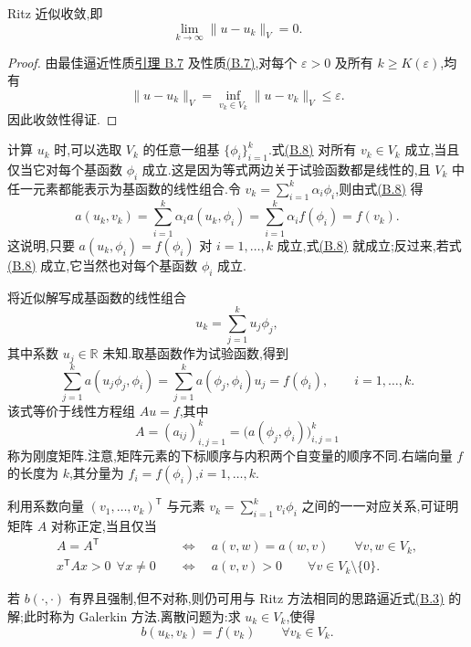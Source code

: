 \begin{theorem}\label{thm:appendix-b-8}
Ritz 近似收敛,即
\[
 \lim_{k\to\infty}\|u-u_k\|_V=0.
\]
\end{theorem}
\begin{proof}
由最佳逼近性质\hyperref[lem:appendix-b-7]{引理 B.7} 及性质\hyperref[eq:appendix-b-7]{(B.7)},对每个 $\varepsilon>0$ 及所有 $k\ge K(\varepsilon)$,均有
\[
 \|u-u_k\|_V=\inf_{v_k\in V_k}\|u-v_k\|_V\le\varepsilon.
\]
因此收敛性得证.
\end{proof}

\begin{note}\label{note:appendix-b-9}
计算 $u_k$ 时,可以选取 $V_k$ 的任意一组基 $\{\phi_i\}_{i=1}^k$.式\hyperref[eq:appendix-b-8]{(B.8)} 对所有 $v_k\in V_k$ 成立,当且仅当它对每个基函数 $\phi_i$ 成立.这是因为等式两边关于试验函数都是线性的,且 $V_k$ 中任一元素都能表示为基函数的线性组合.令
$v_k=\sum_{i=1}^k\alpha_i\phi_i$,则由式\hyperref[eq:appendix-b-8]{(B.8)} 得
\[
 a(u_k,v_k)=\sum_{i=1}^k\alpha_i a(u_k,\phi_i)
 =\sum_{i=1}^k\alpha_i f(\phi_i)=f(v_k).
\]
这说明,只要 $a(u_k,\phi_i)=f(\phi_i)$ 对 $i=1,\ldots,k$ 成立,式\hyperref[eq:appendix-b-8]{(B.8)} 就成立;反过来,若式\hyperref[eq:appendix-b-8]{(B.8)} 成立,它当然也对每个基函数 $\phi_i$ 成立.

将近似解写成基函数的线性组合
\[
 u_k=\sum_{j=1}^k u_j\phi_j,
\]
其中系数 $u_j\in\mathbb R$ 未知.取基函数作为试验函数,得到
\[
 \sum_{j=1}^k a(u_j\phi_j,\phi_i)
 =\sum_{j=1}^k a(\phi_j,\phi_i)u_j
 =f(\phi_i),\qquad i=1,\ldots,k.
\]
该式等价于线性方程组 $Au=f$,其中
\[
 A=(a_{ij})_{i,j=1}^k
   =\bigl(a(\phi_j,\phi_i)\bigr)_{i,j=1}^k
\]
称为刚度矩阵.注意,矩阵元素的下标顺序与内积两个自变量的顺序不同.右端向量 $f$ 的长度为 $k$,其分量为 $f_i=f(\phi_i)$,$i=1,\ldots,k$.

利用系数向量 $(v_1,\ldots,v_k)^{\mathsf T}$ 与元素
$v_k=\sum_{i=1}^k v_i\phi_i$ 之间的一一对应关系,可证明矩阵 $A$ 对称正定,当且仅当
\[
\begin{aligned}
 A=A^{\mathsf T}
 &\quad\Longleftrightarrow\quad
 a(v,w)=a(w,v)\qquad \forall v,w\in V_k,\\
 x^{\mathsf T}Ax>0\ \ \forall x\ne0
 &\quad\Longleftrightarrow\quad
 a(v,v)>0\qquad \forall v\in V_k\setminus\{0\}.
\end{aligned}
\]
\end{note}

\begin{note}[有界强制双线性型的情形]\label{note:appendix-b-10}
若 $b(\cdot,\cdot)$ 有界且强制,但不对称,则仍可用与 Ritz 方法相同的思路逼近式\hyperref[eq:appendix-b-3]{(B.3)} 的解;此时称为 Galerkin 方法.离散问题为:求 $u_k\in V_k$,使得
\begin{equation}\label{eq:appendix-b-11}
 b(u_k,v_k)=f(v_k)\qquad \forall v_k\in V_k.
\end{equation}
\end{note}

